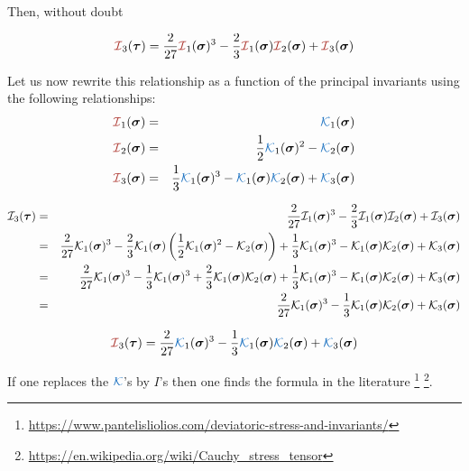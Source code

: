 Then, without doubt

\begin{mdframed}[backgroundcolor=blue!5]
\[
{\III}_3(\bm\tau) =
 \frac{2}{27}  {\III}_1(\bm\sigma)^3 - \frac23{\III}_1(\bm\sigma) {\III}_2(\bm\sigma)
+{\III}_3(\bm\sigma)
\]
\end{mdframed}

Let us now rewrite this relationship as a function of the principal invariants using the 
following relationships:
\begin{eqnarray}
{\III}_1({\bm \sigma})&=& {\KKK}_1({\bm \sigma}) \nn\\ 
{\III}_2({\bm \sigma})&=& \frac{1}{2}{\KKK}_1({\bm \sigma})^2-{\KKK}_2({\bm \sigma}) \nn\\
{\III}_3({\bm \sigma})&=& \frac{1}{3}{\KKK}_1({\bm \sigma})^3-{\KKK}_1({\bm \sigma}) \nn
{\KKK}_2({\bm \sigma}) +{\KKK}_3({\bm \sigma})
\end{eqnarray}

\begin{eqnarray}
{\cal I}_3(\bm\tau) 
&=& \frac{2}{27} {\cal I}_1(\bm\sigma)^3 
-\frac23 {\cal I}_1(\bm\sigma){\cal I}_2(\bm\sigma) + {\cal I}_3(\bm \sigma) \nonumber\\
&=& \frac{2}{27} {\cal K}_1(\bm\sigma)^3
-\frac23 {\cal K}_1(\bm\sigma)  \left( \frac{1}{2}{\cal K}_1({\bm \sigma})^2 -{\cal K}_2({\bm \sigma}) \right)
+ \frac{1}{3}{\cal K}_1({\bm \sigma})^3 -{\cal K}_1({\bm \sigma}) 
{\cal K}_2({\bm \sigma}) +{\cal K}_3({\bm \sigma}) \nonumber\\
&=& \frac{2}{27} {\cal K}_1(\bm\sigma)^3
-\frac13 {\cal K}_1(\bm\sigma)^3 
+\frac23 {\cal K}_1(\bm\sigma)  {\cal K}_2({\bm \sigma}) 
+ \frac{1}{3}{\cal K}_1({\bm \sigma})^3 -{\cal K}_1({\bm \sigma}) {\cal K}_2({\bm \sigma}) 
+{\cal K}_3({\bm \sigma}) \nonumber\\
&=& \frac{2}{27} {\cal K}_1(\bm\sigma)^3
-\frac13 {\cal K}_1(\bm\sigma)  {\cal K}_2({\bm \sigma}) 
+{\cal K}_3({\bm \sigma}) 
\end{eqnarray}

\begin{mdframed}[backgroundcolor=blue!5]
\begin{equation}
{\III}_3(\bm\tau) 
= 
\frac{2}{27} {\KKK}_1(\bm\sigma)^3 -\frac13 {\KKK}_1(\bm\sigma)  {\KKK}_2({\bm \sigma}) +{\KKK}_3({\bm \sigma}) 
\end{equation}
\end{mdframed}

If one replaces the ${\KKK}$'s by $I$'s then one finds the formula in the literature 
\footnote{\url{https://www.pantelisliolios.com/deviatoric-stress-and-invariants/}}
\footnote{\url{https://en.wikipedia.org/wiki/Cauchy_stress_tensor}}.


